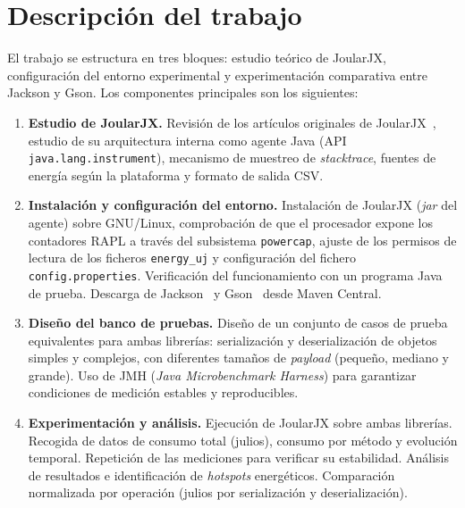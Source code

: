 \documentclass[11pt,a4paper,oneside]{article}
\begin{document}
\section{Descripción del trabajo}
\label{sec:descr-del-trab}

El trabajo se estructura en tres bloques: estudio teórico de JoularJX,
configuración del entorno experimental y experimentación comparativa
entre Jackson y Gson. Los componentes principales son los siguientes:

\begin{enumerate}

\item \textbf{Estudio de JoularJX.} Revisión de los artículos originales de
  JoularJX~\cite{joularjx2022,joularjx3}, estudio de su arquitectura
  interna como agente Java (API \texttt{java.lang.instrument}),
  mecanismo de muestreo de \textit{stacktrace}, fuentes de energía según
  la plataforma y formato de salida CSV.

\item \textbf{Instalación y configuración del entorno.} Instalación de
  JoularJX (\textit{jar} del agente) sobre GNU/Linux, comprobación de que
  el procesador expone los contadores RAPL a través del subsistema
  \texttt{powercap}, ajuste de los permisos de lectura de los ficheros
  \texttt{energy\_uj} y configuración del fichero
  \texttt{config.properties}. Verificación del funcionamiento con un
  programa Java de prueba. Descarga de Jackson~\cite{jackson} y
  Gson~\cite{gson} desde Maven Central.

\item \textbf{Diseño del banco de pruebas.} Diseño de un conjunto de casos de
  prueba equivalentes para ambas librerías: serialización y
  deserialización de objetos simples y complejos, con diferentes tamaños
  de \textit{payload} (pequeño, mediano y grande). Uso de JMH
  (\textit{Java Microbenchmark Harness}) para garantizar condiciones de
  medición estables y reproducibles.

\item \textbf{Experimentación y análisis.} Ejecución de JoularJX sobre ambas
  librerías. Recogida de datos de consumo total (julios), consumo por
  método y evolución temporal. Repetición de las mediciones para
  verificar su estabilidad. Análisis de resultados e identificación de
  \textit{hotspots} energéticos. Comparación normalizada por operación
  (julios por serialización y deserialización).

\end{enumerate}
\end{document}
